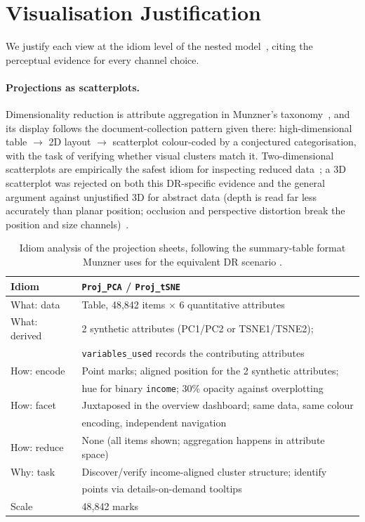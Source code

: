 \documentclass[11pt,a4paper]{article}
\begin{document}
\section{Visualisation Justification}\label{sec:vis}
We justify each view at the idiom level of the nested
model~\cite[Ch.~4]{munzner}, citing the perceptual evidence for every
channel choice.

\paragraph{Projections as scatterplots.}
Dimensionality reduction is attribute aggregation in Munzner's
taxonomy~\cite[\S13.4.3]{munzner}, and its display follows the
document-collection pattern given there: high-dimensional table
$\rightarrow$ 2D layout $\rightarrow$ scatterplot colour-coded by a
conjectured categorisation, with the task of verifying whether visual
clusters match it. Two-dimensional scatterplots are empirically the safest
idiom for inspecting reduced data~\cite{sedlmair}; a 3D scatterplot was
rejected on both this DR-specific evidence and the general argument against
unjustified 3D for abstract data (depth is read far less accurately than
planar position; occlusion and perspective distortion break the position
and size channels)~\cite[Ch.~6.3]{munzner}.

\begin{table}[h]\centering\small
\begin{tabular}{ll}
\hline
Idiom & \texttt{Proj\_PCA} / \texttt{Proj\_tSNE} \\
\hline
What: data & Table, 48{,}842 items $\times$ 6 quantitative attributes \\
What: derived & 2 synthetic attributes (PC1/PC2 or TSNE1/TSNE2); \\
 & \texttt{variables\_used} records the contributing attributes \\
How: encode & Point marks; aligned position for the 2 synthetic attributes; \\
 & hue for binary \texttt{income}; 30\% opacity against overplotting \\
How: facet & Juxtaposed in the overview dashboard; same data, same colour \\
 & encoding, independent navigation \\
How: reduce & None (all items shown; aggregation happens in attribute space) \\
Why: task & Discover/verify income-aligned cluster structure; identify \\
 & points via details-on-demand tooltips \\
Scale & 48{,}842 marks \\
\hline
\end{tabular}
\caption{Idiom analysis of the projection sheets, following the summary-table
format Munzner uses for the equivalent DR scenario \cite[p.~319]{munzner}.}
\end{table}
\end{document}
